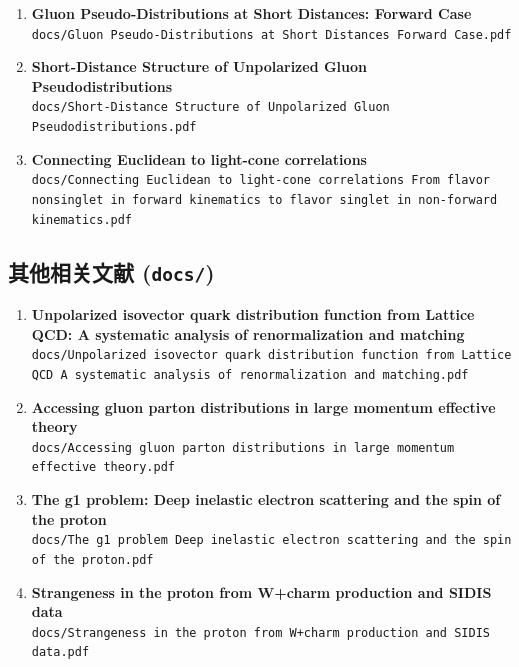 \documentclass[12pt,a4paper]{ctexart}
\begin{document}
\begin{enumerate}
    \item \textbf{Gluon Pseudo-Distributions at Short Distances: Forward Case} \\
    \texttt{docs/Gluon Pseudo-Distributions at Short Distances Forward Case.pdf}

    \item \textbf{Short-Distance Structure of Unpolarized Gluon Pseudodistributions} \\
    \texttt{docs/Short-Distance Structure of Unpolarized Gluon Pseudodistributions.pdf}

    \item \textbf{Connecting Euclidean to light-cone correlations} \\
    \texttt{docs/Connecting Euclidean to light-cone correlations From flavor nonsinglet in forward kinematics to flavor singlet in non-forward kinematics.pdf}
\end{enumerate}

\subsection{其他相关文献 (\texttt{docs/})}

\begin{enumerate}
    \item \textbf{Unpolarized isovector quark distribution function from Lattice QCD: A systematic analysis of renormalization and matching} \\
    \texttt{docs/Unpolarized isovector quark distribution function from Lattice QCD A systematic analysis of renormalization and matching.pdf}

    \item \textbf{Accessing gluon parton distributions in large momentum effective theory} \\
    \texttt{docs/Accessing gluon parton distributions in large momentum effective theory.pdf}

    \item \textbf{The g1 problem: Deep inelastic electron scattering and the spin of the proton} \\
    \texttt{docs/The g1 problem Deep inelastic electron scattering and the spin of the proton.pdf}

    \item \textbf{Strangeness in the proton from W+charm production and SIDIS data} \\
    \texttt{docs/Strangeness in the proton from W+charm production and SIDIS data.pdf}
\end{enumerate}
\end{document}
